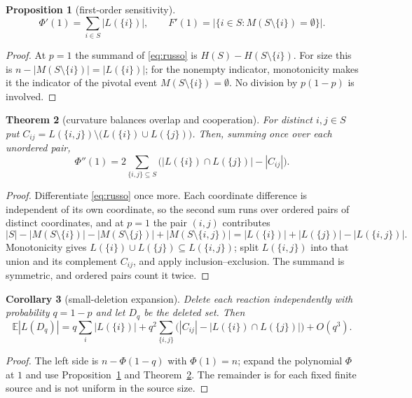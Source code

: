 \documentclass[11pt,a4paper]{article}
\theoremstyle{plain}
\newtheorem{theorem}{Theorem}[section]
\newtheorem{proposition}[theorem]{Proposition}
\newtheorem{corollary}[theorem]{Corollary}
\theoremstyle{definition}
\theoremstyle{remark}
\newcommand{\E}{\mathbb{E}}
\begin{document}
\begin{proposition}[first-order sensitivity]\label{prop:firstorder}
\[
\Phi'(1)=\sum_{i\in S}|L(\{i\})|,\qquad F'(1)=\big|\{i\in S: M(S\setminus\{i\})=\emptyset\}\big| .
\]
\end{proposition}

\begin{proof}
At $p=1$ the summand of \eqref{eq:russo} is $H(S)-H(S\setminus\{i\})$. For size this is $n-|M(S\setminus\{i\})|=|L(\{i\})|$; for the nonempty indicator, monotonicity makes it the indicator of the pivotal event $M(S\setminus\{i\})=\emptyset$. No division by $p(1-p)$ is involved.
\end{proof}

\begin{theorem}[curvature balances overlap and cooperation]\label{thm:curvature}
For distinct $i,j\in S$ put $C_{ij}=L(\{i,j\})\setminus\big(L(\{i\})\cup L(\{j\})\big)$. Then, summing once over each unordered pair,
\[
\Phi''(1)=2\sum_{\{i,j\}\subseteq S}\Big(|L(\{i\})\cap L(\{j\})|-|C_{ij}|\Big).
\]
\end{theorem}

\begin{proof}
Differentiate \eqref{eq:russo} once more. Each coordinate difference is independent of its own coordinate, so the second sum runs over ordered pairs of distinct coordinates, and at $p=1$ the pair $(i,j)$ contributes
\[
|S|-|M(S\setminus\{i\})|-|M(S\setminus\{j\})|+|M(S\setminus\{i,j\})|=|L(\{i\})|+|L(\{j\})|-|L(\{i,j\})| .
\]
Monotonicity gives $L(\{i\})\cup L(\{j\})\subseteq L(\{i,j\})$; split $L(\{i,j\})$ into that union and its complement $C_{ij}$, and apply inclusion--exclusion. The summand is symmetric, and ordered pairs count it twice.
\end{proof}

\begin{corollary}[small-deletion expansion]\label{cor:taylor}
Delete each reaction independently with probability $q=1-p$ and let $D_q$ be the deleted set. Then
\[
\E|L(D_q)|=q\sum_{i}|L(\{i\})|+q^{2}\sum_{\{i,j\}}\Big(|C_{ij}|-|L(\{i\})\cap L(\{j\})|\Big)+O(q^{3}).
\]
\end{corollary}

\begin{proof}
The left side is $n-\Phi(1-q)$ with $\Phi(1)=n$; expand the polynomial $\Phi$ at $1$ and use Proposition~\ref{prop:firstorder} and Theorem~\ref{thm:curvature}. The remainder is for each fixed finite source and is not uniform in the source size.
\end{proof}
\end{document}
